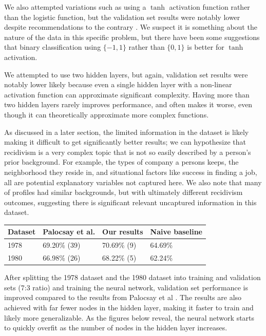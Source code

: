 \documentclass[a4paper]{article}
\theoremstyle{plain}
\begin{document}
We also attempted variations such as using a $\tanh$ activation function rather than the logistic function, but the validation set results were notably lower despite recommendations to the contrary \cite{lecun-98b}. We suspect it is something about the nature of the data in this specific problem, but there have been some suggestions that binary classification using $\{-1, 1\}$ rather than $\{0, 1\}$ is better for $\tanh$ activation.\cite{lecun-98b}

We attempted to use two hidden layers, but again, validation set results were notably lower likely because even a single hidden layer with a non-linear activation function can approximate significant complexity. Having more than two hidden layers rarely improves performance, and often makes it worse, even though it can theoretically approximate more complex functions. \cite{bengio2007scaling}

As discussed in a later section, the limited information in the dataset is likely making it difficult to get significantly better results; we can hypothesize that recidivism is a very complex topic that is not so easily described by a person's prior background. For example, the types of company a persons keeps, the neighborhood they reside in, and situational factors like success in finding a job, all are potential explanatory variables not captured here.\cite{tillyer2011social} We also note that many of profiles had similar backgrounds, but with ultimately different recidivism outcomes, suggesting there is significant relevant uncaptured information in this dataset.

\begin{center}
\begin{tabular}{l l l l}
\toprule
\textbf{Dataset} & \textbf{Palocsay et al.} & \textbf{Our results} & \textbf{Naive baseline} \\
\midrule
1978 & 69.20\% (39) & 70.69\% (9) & 64.69\% \\
1980 & 66.98\% (26) & 68.22\% (5) & 62.24\% \\
\bottomrule
\end{tabular}
\end{center} 

After splitting the 1978 dataset and the 1980 dataset into training and validation sets (7:3 ratio) and training the neural network, validation set performance is improved compared to the results from Palocsay et al \cite{bib1}. The results are also achieved with far fewer nodes in the hidden layer, making it faster to train and likely more generalizable. As the figures below reveal, the neural network starts to quickly overfit as the number of nodes in the hidden layer increases.
\end{document}
